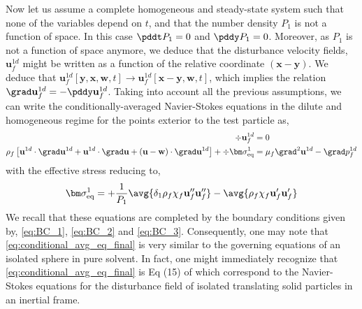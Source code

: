 Now let us assume a complete homogeneous and steady-state system such that none of the variables depend on $t$, and that the number density $P_1$ is not a function of space. 
In this case $\pddt P_1 = 0$ and $\pddy P_1 = 0$.
Moreover, as $P_1$ is not a function of space anymore, we deduce that the disturbance velocity fields, $\textbf{u}_f^{1d}$ might be written as a function of the relative coordinate $(\textbf{x} - \textbf{y})$. 
We deduce that $\textbf{u}_f^{1d}[\textbf{y},\textbf{x},\textbf{w},t] \to \textbf{u}_f^{1d}[\textbf{x}-\textbf{y},\textbf{w},t]$, which implies the relation  $\grad \textbf{u}_f^{1d} = - \pddy \textbf{u}^{1d}_f$.
Taking into account all the previous assumptions, we can write the conditionally-averaged Navier-Stokes equations in the dilute and homogeneous regime for the points exterior to the test particle as, 
\begin{align}
    \div \textbf{u}^{1d}_f &= 0 \\
    \rho_f \left[
        \textbf{u}^{1d}\cdot \grad\textbf{u}^{1d} 
        +  \textbf{u}^{1d}\cdot \grad\textbf{u} 
        +  (\textbf{u} - \textbf{w})\cdot \grad\textbf{u}^{1d}
    \right]
    + \div \bm\sigma^1_\text{eq}
    &=
        \mu_f \grad^2 \textbf{u}^{1d}  
        - \grad p_f^{1d} 
    \label{eq:conditional_avg_eq_final}
\end{align}
with the effective stress reducing to,
\begin{equation*}
    \bm\sigma^1_\text{eq}
    =
    + \frac{1}{P_1}\avg{\delta_1\rho_f\chi_f\textbf{u}_f''\textbf{u}_f''}
    - \avg{\rho_f\chi_f\textbf{u}_f'\textbf{u}_f'}
\end{equation*}
We recall that these equations are completed by the boundary conditions given by, \ref{eq:BC_1}, \ref{eq:BC_2} and \ref{eq:BC_3}.
Consequently, one may note that \ref{eq:conditional_avg_eq_final} is very similar to the governing equations of an isolated sphere in pure solvent. 
In fact, one might immediately recognize that \ref{eq:conditional_avg_eq_final} is Eq (15) of \citep{maxey1983equation} which correspond to the Navier-Stokes equations for the disturbance field of isolated translating solid particles in an inertial frame. 
